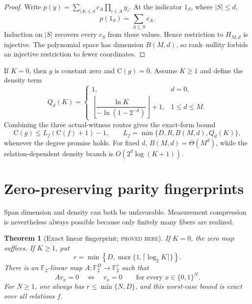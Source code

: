 \documentclass[11pt]{article}
\newtheorem{theorem}{Theorem}[section]
\theoremstyle{definition}
\theoremstyle{remark}
\newcommand{\bits}{\{0,1\}}
\newcommand{\F}{\mathbb F}
\newcommand{\C}{\mathrm C}
\newcommand{\status}[1]{\textsc{#1}}
\begin{document}
\begin{proof}
Write $p(y)=\sum_{|A|\le d}c_A\prod_{i\in A}y_i$.  At the indicator $1_S$,
where $|S|\le d$,
\[
  p(1_S)=\sum_{A\subseteq S}c_A.
\]
Induction on $|S|$ recovers every $c_S$ from these values.  Hence restriction
to $H_{M,d}$ is injective.  The polynomial space has dimension $B(M,d)$, so
rank--nullity forbids an injective restriction to fewer coordinates.
\end{proof}

If $K=0$, then $g$ is constant zero and $\C(g)=0$.  Assume $K\ge1$ and define
the density term
\[
  Q_d(K)=
  \begin{cases}
    1,&d=0,\\[0.2em]
    \left\lfloor\dfrac{\ln K}{-\ln(1-2^{-d})}\right\rfloor+1,
      &1\le d\le M.
  \end{cases}
\]
Combining the three actual-witness routes gives the exact-form bound
\[
  \C(g)\le L_f(\C(f)+1)-1,
  \qquad
  L_f=\min\{D,R,B(M,d),Q_d(K)\},
  \tag{3.8}\label{eq:low-degree-combined}
\]
whenever the degree promise holds.  For fixed $d$,
$B(M,d)=\Theta(M^d)$, while the relation-dependent density branch is
$O(2^d\log(K+1))$.

\section{Zero-preserving parity fingerprints}
\label{sec:fingerprints}

Span dimension and density can both be unfavorable.  Measurement compression
is nevertheless always possible because only finitely many fibers are
realized.

\begin{theorem}[Exact linear fingerprint; \status{proved here}]
\label{thm:exact-fingerprint}
If $K=0$, the zero map suffices.  If $K\ge1$, put
\[
  r=\min\left\{D,\max\{1,\lceil\log_2K\rceil\}\right\}.
  \tag{4.1}\label{eq:fingerprint-width}
\]
There is an $\F_2$-linear map $A:\F_2^D\to\F_2^r$ such that
\[
  Av_x=0\quad\Longleftrightarrow\quad v_x=0
  \qquad\text{for every }x\in\bits^N.
  \tag{4.2}\label{eq:zero-preserving}
\]
For $N\ge1$, one always has $r\le\min\{N,D\}$, and this worst-case bound is
exact over all relations $f$.
\end{theorem}
\end{document}
